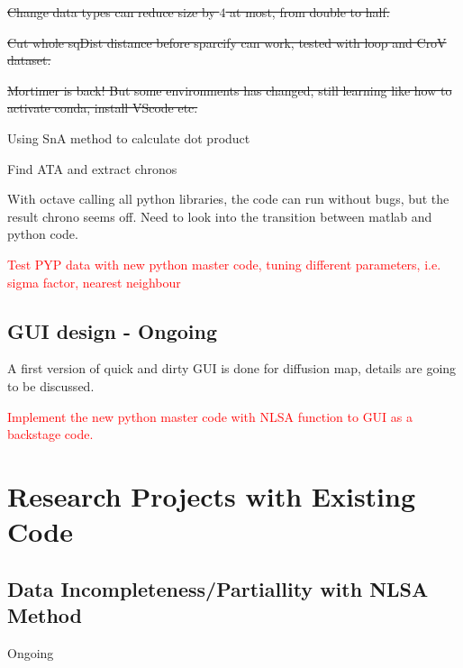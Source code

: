 \documentclass{article}
\begin{document}
\st{Change data types can reduce size by $4$ at most, from double to half.}

\st{Cut whole sqDist distance before sparcify can work, tested with loop and CroV dataset.}

\st{Mortimer is back! But some environments has changed, still learning like how to activate conda, install VScode etc.}


\noindent Using SnA method to calculate dot product

\noindent Find ATA and extract chronos

\noindent With octave calling all python libraries, the code can run without bugs, but the result chrono seems off. Need to look into the transition between matlab and python code.

\noindent \textcolor{red}{Test PYP data with new python master code, tuning different parameters, i.e. sigma factor, nearest neighbour}
\subsection*{GUI design - Ongoing}
A first version of quick and dirty GUI is done for diffusion map, details are going to be discussed.




\noindent \textcolor{red}{Implement the new python master code with NLSA function to GUI as a backstage code.}
\section*{Research Projects with Existing Code}
\subsection*{Data Incompleteness/Partiallity with NLSA Method}
Ongoing
\end{document}
